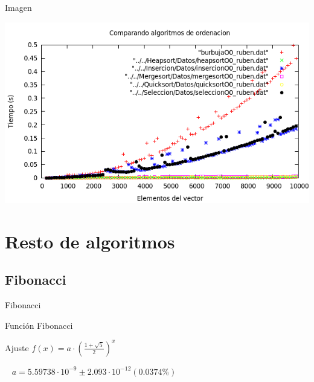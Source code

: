 \documentclass[compress]{beamer}
\begin{document}
\begin{frame}
	\begin{alertblock}{Imagen}
	\begin{center}
	\includegraphics[scale=0.45]{../Graficas/todos.png}
	\end{center}
	\end{alertblock}
\end{frame}




\section{Resto de algoritmos}
\subsection{Fibonacci}
\begin{frame}{Fibonacci}
	\begin{block}{Función}
		Fibonacci
	\end{block}
	
	\begin{block}{Ajuste}
	$ f(x) = a\cdot   \left( \displaystyle\frac{1+\sqrt5}{2} \right)^x $

	{\ }
	$a               = 5.59738\cdot 10^{-9}      \pm 2.093\cdot 10^{-12}    (0.0374\%)$
	\end{block}
\end{frame}
\end{document}
